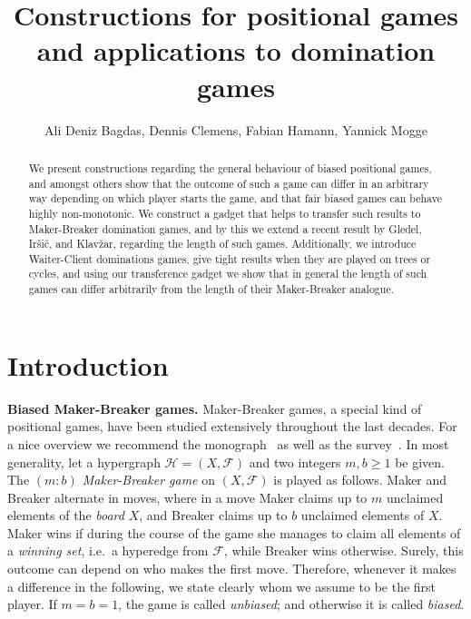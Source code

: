 \documentclass[reqno, 12pt]{amsart}
\title{Constructions for positional games and applications to domination games}
\author{Ali Deniz Bagdas, Dennis Clemens, Fabian Hamann, Yannick Mogge}
\numberwithin{equation}{section}
\numberwithin{figure}{section}
\newcommand{\calH}{\mathcal{H}}
\newcommand{\calF}{\mathcal{F}}
\begin{document}
\maketitle


\begin{abstract}
We present constructions regarding the general behaviour 
of biased positional games, and amongst others show
that the outcome of such a game can differ in an arbitrary way depending on which player starts the game, and that fair biased games can behave highly non-monotonic.
We construct a gadget that helps to transfer such results to Maker-Breaker domination games, and by this we extend a recent result by Gledel, Ir{\v{s}}i{\v{c}}, and Klav{\v{z}}ar, regarding the length of such games. Additionally, we introduce Waiter-Client dominations games, give tight results when they are played on trees or cycles,
and using our transference gadget we show that in general the length of such games can differ arbitrarily from the length of their Maker-Breaker analogue. 
\end{abstract}




\section{Introduction}

\textbf{Biased Maker-Breaker games.}
Maker-Breaker games, a special kind of positional games, have been studied extensively throughout the last 
decades. For a nice overview we recommend the monograph~\cite{hefetz2014positional} 
as well as the survey~\cite{krivelevich2014positional}. 
In most generality,
let a hypergraph $\calH = (X,\calF)$ and two integers $m,b\geq 1$ be given. The \textit{$(m:b)$ Maker-Breaker game} on $(X,\calF)$ is played as follows. Maker and Breaker alternate in moves,
where in a move Maker claims up to $m$ unclaimed elements of the 
\textit{board} $X$,
and Breaker claims up to $b$ unclaimed elements of $X$.
Maker wins if during the course of the game she manages to claim all elements of a \textit{winning set}, i.e.~a hyperedge  from $\calF$, while Breaker wins otherwise.
Surely, this outcome can depend on who makes the first move. Therefore, whenever it makes a difference in the following, we state clearly whom we assume to be the first player.
If $m=b=1$, the game is called \textit{unbiased}; and otherwise it is called \textit{biased}.
\end{document}

